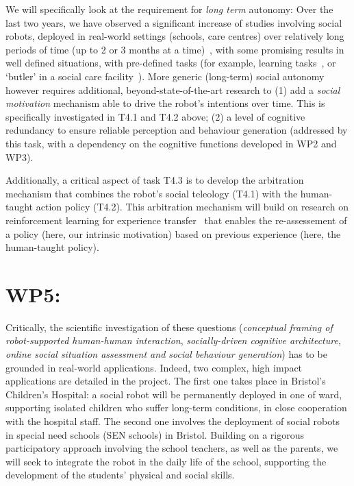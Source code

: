 \documentclass[11pt,a4paper]{report}
\begin{document}
We will specifically look at the requirement for \emph{long term} autonomy: Over
the last two years, we have observed a significant increase of studies
involving social robots, deployed in real-world settings (schools, care centres)
over relatively long periods of time (up to 2 or 3 months at a
time)~\cite{kunze2018artificial,leite2013social}, with some promising results
in well defined situations, with pre-defined tasks (for example, learning
tasks~\cite{senft2019teaching}, or `butler' in a social care
facility~\cite{hawes2017strands}). More generic (long-term) social autonomy
however requires additional, beyond-state-of-the-art research to (1) add a
\emph{social motivation} mechanism able to drive the robot's intentions over
time. This is specifically investigated in T4.1 and T4.2 above; (2) a level of
cognitive redundancy to ensure reliable perception and behaviour generation
(addressed by this task, with a dependency on the cognitive functions developed
in WP2 and WP3).

Additionally, a critical aspect of task T4.3 is to develop the arbitration
mechanism that combines the robot's social teleology (T4.1) with the human-taught
action policy (T4.2). This arbitration mechanism will build on research on
reinforcement learning for experience transfer~\cite{madden2004transfer} that
enables the re-assessement of a policy (here, our intrinsic motivation) based on
previous experience (here, the human-taught policy).




\section{WP5: \textbf{\wpFive}}

Critically, the scientific investigation of these questions (\emph{conceptual
framing of robot-supported human-human interaction}, \emph{socially-driven
cognitive architecture},  \emph{online social situation assessment and social
behaviour generation}) has to be
grounded in real-world applications. Indeed, two complex, high impact
applications are detailed in the project. The first one takes place in
Bristol's Children's Hospital: a social robot will be permanently deployed in one
of ward, supporting isolated children who suffer long-term conditions, in close
cooperation with the hospital staff. The second one involves the deployment of 
social robots in special need schools (SEN schools) in Bristol. Building on a
rigorous participatory approach involving the school teachers, as well as the
parents, we will seek to integrate the robot in the daily life of the school,
supporting the development of the students' physical and social skills.
\end{document}

